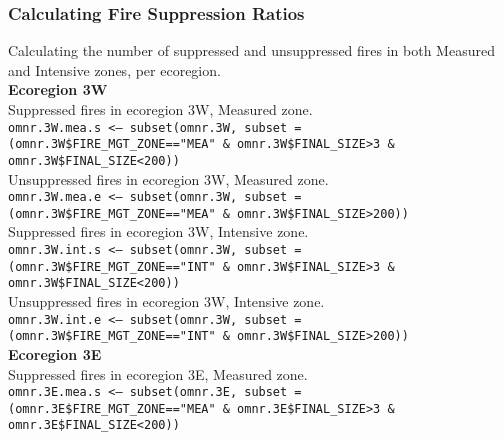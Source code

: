 \begin{spacing}{1.5}
\subsubsection{Calculating Fire Suppression Ratios}
Calculating the number of suppressed and unsuppressed fires in both Measured and Intensive zones, per ecoregion.\\

\noindent \textbf{Ecoregion 3W} \\

\noindent Suppressed fires in ecoregion 3W, Measured zone. \\

\noindent \texttt{omnr.3W.mea.s <-- subset(omnr.3W, subset = (omnr.3W\$FIRE\_MGT\_ZONE==\linebreak "MEA" \& omnr.3W\$FINAL\_SIZE>3 \& omnr.3W\$FINAL\_SIZE<200))} \\

\noindent Unsuppressed fires in ecoregion 3W, Measured zone. \\

\noindent \texttt{omnr.3W.mea.e <-- subset(omnr.3W, subset = (omnr.3W\$FIRE\_MGT\_ZONE==\linebreak "MEA" \& omnr.3W\$FINAL\_SIZE>200))} \\

\noindent Suppressed fires in ecoregion 3W, Intensive zone. \\

\noindent \texttt{omnr.3W.int.s <-- subset(omnr.3W, subset = (omnr.3W\$FIRE\_MGT\_ZONE==\linebreak "INT" \& omnr.3W\$FINAL\_SIZE>3 \& omnr.3W\$FINAL\_SIZE<200))} \\

\noindent Unsuppressed fires in ecoregion 3W, Intensive zone. \\

\noindent \texttt{omnr.3W.int.e <-- subset(omnr.3W, subset = (omnr.3W\$FIRE\_MGT\_ZONE==\linebreak "INT" \& omnr.3W\$FINAL\_SIZE>200))} \\

\noindent \textbf{Ecoregion 3E} \\

\noindent Suppressed fires in ecoregion 3E, Measured zone. \\

\noindent \texttt{omnr.3E.mea.s <-- subset(omnr.3E, subset = (omnr.3E\$FIRE\_MGT\_ZONE==\linebreak "MEA" \& omnr.3E\$FINAL\_SIZE>3 \& omnr.3E\$FINAL\_SIZE<200))} \\


\end{spacing}
